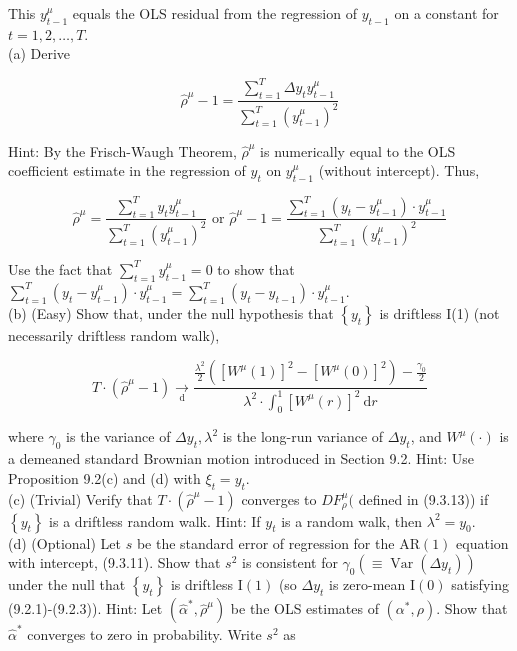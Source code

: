 \documentclass[10pt]{article}
\begin{document}
This $y_{t-1}^{\mu}$ equals the OLS residual from the regression of $y_{t-1}$ on a constant for $t=1,2, \ldots, T$.\\
(a) Derive


\begin{equation*}
\hat{\rho}^{\mu}-1=\frac{\sum_{t=1}^{T} \Delta y_{t} y_{t-1}^{\mu}}{\sum_{t=1}^{T}\left(y_{t-1}^{\mu}\right)^{2}} \tag{2}
\end{equation*}


Hint: By the Frisch-Waugh Theorem, $\hat{\rho}^{\mu}$ is numerically equal to the OLS coefficient estimate in the regression of $y_{t}$ on $y_{t-1}^{\mu}$ (without intercept). Thus,


\begin{equation*}
\hat{\rho}^{\mu}=\frac{\sum_{t=1}^{T} y_{t} y_{t-1}^{\mu}}{\sum_{t=1}^{T}\left(y_{t-1}^{\mu}\right)^{2}} \text { or } \hat{\rho}^{\mu}-1=\frac{\sum_{t=1}^{T}\left(y_{t}-y_{t-1}^{\mu}\right) \cdot y_{t-1}^{\mu}}{\sum_{t=1}^{T}\left(y_{t-1}^{\mu}\right)^{2}} \tag{3}
\end{equation*}


Use the fact that $\sum_{t=1}^{T} y_{t-1}^{\mu}=0$ to show that $\sum_{t=1}^{T}\left(y_{t}-y_{t-1}^{\mu}\right) \cdot y_{t-1}^{\mu}= \sum_{t=1}^{T}\left(y_{t}-y_{t-1}\right) \cdot y_{t-1}^{\mu}$.\\
(b) (Easy) Show that, under the null hypothesis that $\left\{y_{t}\right\}$ is driftless I(1) (not necessarily driftless random walk),


\begin{equation*}
T \cdot\left(\hat{\rho}^{\mu}-1\right) \underset{\mathrm{d}}{\rightarrow} \frac{\frac{\lambda^{2}}{2}\left(\left[W^{\mu}(1)\right]^{2}-\left[W^{\mu}(0)\right]^{2}\right)-\frac{\gamma_{0}}{2}}{\lambda^{2} \cdot \int_{0}^{1}\left[W^{\mu}(r)\right]^{2} \mathrm{~d} r} \tag{4}
\end{equation*}


where $\gamma_{0}$ is the variance of $\Delta y_{t}, \lambda^{2}$ is the long-run variance of $\Delta y_{t}$, and $W^{\mu}(\cdot)$ is a demeaned standard Brownian motion introduced in Section 9.2. Hint: Use Proposition 9.2(c) and (d) with $\xi_{t}=y_{t}$.\\
(c) (Trivial) Verify that $T \cdot\left(\hat{\rho}^{\mu}-1\right)$ converges to $D F_{\rho}^{\mu}($ defined in (9.3.13)) if $\left\{y_{t}\right\}$ is a driftless random walk. Hint: If $y_{t}$ is a random walk, then $\lambda^{2}=y_{0}$.\\
(d) (Optional) Let $s$ be the standard error of regression for the $\mathrm{AR}(1)$ equation with intercept, (9.3.11). Show that $s^{2}$ is consistent for $\gamma_{0}\left(\equiv \operatorname{Var}\left(\Delta y_{t}\right)\right)$ under the null that $\left\{y_{t}\right\}$ is driftless $\mathrm{I}(1)$ (so $\Delta y_{t}$ is zero-mean $\mathrm{I}(0)$ satisfying (9.2.1)-(9.2.3)). Hint: Let $\left(\hat{\alpha}^{*}, \hat{\rho}^{\mu}\right)$ be the OLS estimates of $\left(\alpha^{*}, \rho\right)$. Show that $\hat{\alpha}^{*}$ converges to zero in probability. Write $s^{2}$ as
\end{document}
